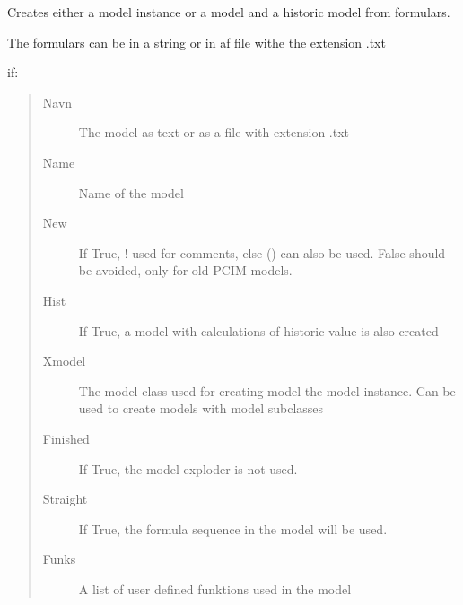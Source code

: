 \documentclass[letterpaper,10pt,english]{sphinxmanual}
\begin{document}

\begin{fulllineitems}
\label{\detokenize{index:modelclass.create_model}}
\pysigstartsignatures
{}
\pysigstopsignatures
\sphinxAtStartPar
Creates either a model instance or a model and a historic model from formulars.

\sphinxAtStartPar
The formulars can be in a string or in af file withe the extension .txt

\sphinxAtStartPar
if:
\begin{quote}\begin{description}
\item[{Navn}] \leavevmode
\sphinxAtStartPar
The model as text or as a file with extension .txt

\item[{Name}] \leavevmode
\sphinxAtStartPar
Name of the model

\item[{New}] \leavevmode
\sphinxAtStartPar
If True, ! used for comments, else () can also be used. False should be avoided, only for old PCIM models.

\item[{Hist}] \leavevmode
\sphinxAtStartPar
If True, a model with calculations of historic value is also created

\item[{Xmodel}] \leavevmode
\sphinxAtStartPar
The model class used for creating model the model instance. Can be used to create models with model subclasses

\item[{Finished}] \leavevmode
\sphinxAtStartPar
If True, the model exploder is not used.

\item[{Straight}] \leavevmode
\sphinxAtStartPar
If True, the formula sequence in the model will be used.

\item[{Funks}] \leavevmode
\sphinxAtStartPar
A list of user defined funktions used in the model

\end{description}\end{quote}

\end{fulllineitems}
\end{document}
